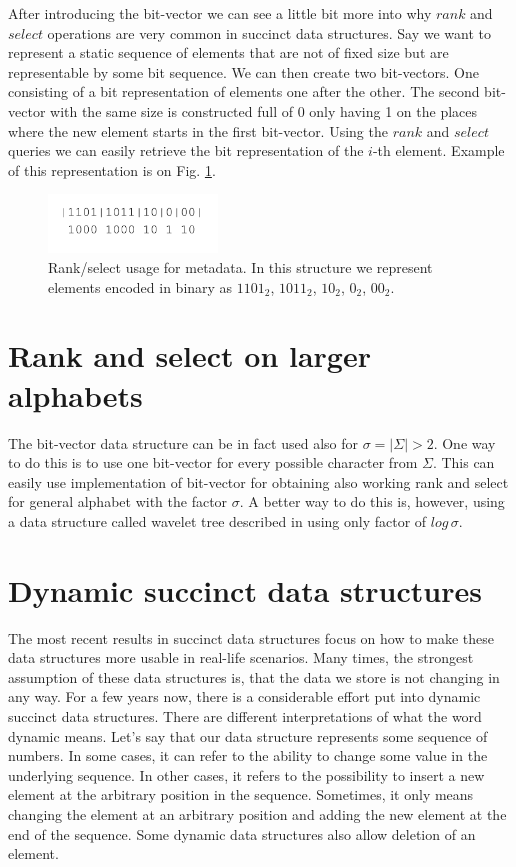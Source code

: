 After introducing the bit-vector we can see a little bit more into why $rank$ and $select$ operations are very common in succinct data structures. Say we want to represent a static sequence of elements that are not of fixed size but are representable by some bit sequence.
We can then create two bit-vectors. One consisting of a bit representation of elements one after the other.
The second bit-vector with the same size is constructed full of 0 only having 1 on the places where the new element starts in the first bit-vector.
Using the $rank$ and $select$ queries we can easily retrieve the bit representation of the $i$-th element.
Example of this representation is on Fig. \ref{obr:obr_rank_select}.

\begin{figure}
\centerline{\includegraphics[width=0.4\textwidth]{images/obr_rank_select}}
\caption[Rank select usage in representation of sequence of elements with different size]{Rank/select usage for metadata. In this structure we represent elements encoded in binary as $1101_2$, $1011_2$, $10_2$, $0_2$, $00_2$.}
\label{obr:obr_rank_select}
\end{figure}

\section{Rank and select on larger alphabets}

The bit-vector data structure can be in fact used also for $\sigma = |\Sigma|>2$. One way to do this is to use one bit-vector for every possible character from $\Sigma$. This can easily use implementation of bit-vector for obtaining also working rank and select for general alphabet with the factor $\sigma$. A better way to do this is, however, using a data structure called wavelet tree described in \cite{grossi2003high} using only factor of $log\,\sigma$.

\section{Dynamic succinct data structures}

The most recent results in succinct data structures focus on how to make these data structures more usable in real-life scenarios. Many times, the
strongest assumption of these data structures is, that the data we store is not changing in any way. For a few years now, there is a considerable effort put into dynamic succinct data structures. There are different interpretations of what the word dynamic means. Let's say that our data structure represents some sequence of numbers. In some cases, it can refer to the ability to change some value in the underlying sequence. In other cases, it refers to the possibility to insert a new element at the arbitrary position in the sequence. Sometimes, it only means changing the element at an arbitrary position and adding the new element at the end of the sequence. Some dynamic data structures also allow deletion of an element.

